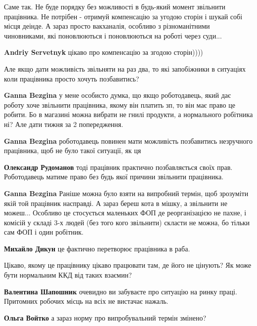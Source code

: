 \begin{itemize}

Саме так. Не буде порядку без можливості в будь-який момент звільнити
працівника. Не потрібен - отримуй компенсацію за угодою сторін і шукай собі
місця деінде. А зараз просто вакханалія, особливо з різноманітними чиновниками,
які поновлюються і поновлюються на роботі через суди...

\begin{itemize} %
\textbf{Andriy Servetnyk} цікаво про компенсацію за згодою сторін))))
\end{itemize} %

Але якщо дати можливість звільняти на раз два, то які запобіжники в ситуаціях
коли працівника просто хочуть позбавитись?

\begin{itemize} %
\textbf{Ganna Bezgina} у мене особисто думка, що якщо роботодавець, який дає роботу хоче звільнити працівника, якому він платить зп, то він має право це робити.
Бо в магазині можна вибрати не гнилі продукти, а нормального робітника ні? Але дати тижня за 2 попередження.

\textbf{Ganna Bezgina} роботодавець повинен мати можливість позбавитись незручного працівника, щоб не було такої ситуації, як ця

\textbf{Олександр Рудоманов} тоді працівник практично позбавляється своїх прав. Роботодавець матиме право без будь якої причини звільнити працівника.

\textbf{Ganna Bezgina} Раніше можна було взяти на випробний термін, щоб зрозуміти якій той працівник насправді. А зараз береш кота в мішку, а звільнити не можеш... Особливо це стосується маленьких ФОП де реорганізацією не пахне, і комісій у складі 3-х людей (без того кого звільнити) скласти не можна, бо тільки сам ФОП і один робітник.

\textbf{Михайло Дикун} це фактично перетворює працівника в раба.

Цікаво, якому це працівнику цікаво працювати там, де його не цінують? Як може бути нормальним ККД від таких взаємин?

\textbf{Валентина Шапошник} очевидно ви забуваєте про ситуацію на ринку праці. Притомних робочих місць на всіх не вистачає нажаль.

\textbf{Ольга Войтко} а зараз норму про випробувальний термін змінено?


\end{itemize}
\end{itemize}
